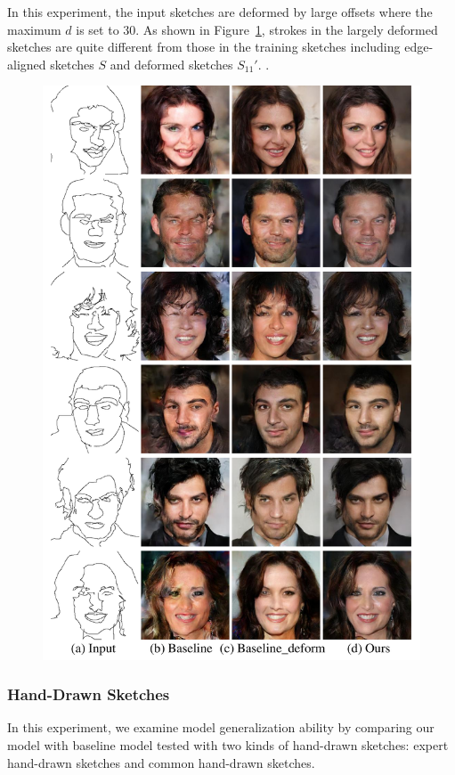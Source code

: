 In this experiment, the input sketches are deformed by large offsets where the maximum $d$ is set to $30$. 
As shown in Figure~\ref{fig:generalization_examples}, strokes in the largely deformed sketches are quite different from those in the training sketches including edge-aligned sketches $S$ and deformed sketches $S_11'$. .
\begin{figure}
	\includegraphics[width=\linewidth]{figs/generalization_examples}
	\caption{}
	\label{fig:generalization_examples}
\end{figure}

\subsubsection{Hand-Drawn Sketches}
In this experiment, we examine model generalization ability by comparing our model with baseline model tested with two kinds of hand-drawn sketches: expert hand-drawn sketches and common hand-drawn sketches.

